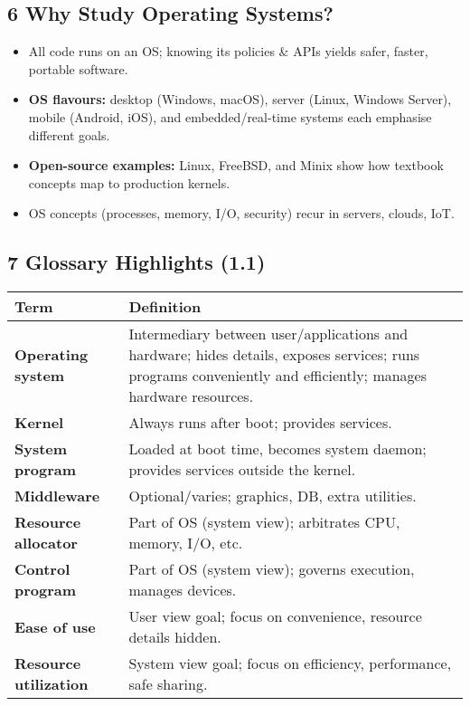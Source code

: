 \documentclass{article}
\begin{document}
\subsection*{6 Why Study Operating Systems?}
\begin{itemize}
    \item All code runs on an OS; knowing its policies \& APIs yields safer, faster, portable software.

\item \textbf{OS flavours:} desktop (Windows, macOS), server (Linux, Windows Server),  
      mobile (Android, iOS), and embedded/real-time systems each emphasise different goals.

\item \textbf{Open-source examples:} Linux, FreeBSD, and Minix show how textbook
      concepts map to production kernels.

\item OS concepts (processes, memory, I/O, security) recur in servers, clouds, IoT.

\end{itemize}

\subsection*{7 Glossary Highlights (1.1)}
\centering
\begin{tabular}{>{\raggedright}p{} >{\raggedright\arraybackslash}p{}}
\toprule
\textbf{Term} & \textbf{Definition} \\
\midrule
\textbf{Operating system} & Intermediary between user/applications and hardware; hides details, exposes services; runs programs conveniently and efficiently; manages hardware resources. \\
\textbf{Kernel} & Always runs after boot; provides services. \\
\textbf{System program} & Loaded at boot time, becomes system daemon; provides services outside the kernel. \\
\textbf{Middleware} & Optional/varies; graphics, DB, extra utilities. \\
\textbf{Resource allocator} & Part of OS (system view); arbitrates CPU, memory, I/O, etc. \\
\textbf{Control program} & Part of OS (system view); governs execution, manages devices. \\
\textbf{Ease of use} & User view goal; focus on convenience, resource details hidden. \\
\textbf{Resource utilization} & System view goal; focus on efficiency, performance, safe sharing. \\
\bottomrule
\end{tabular}
\vspace{\baselineskip}
\end{document}
